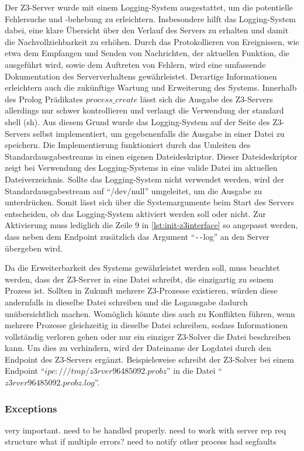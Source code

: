 Der Z3-Server wurde mit einem Logging-System ausgestattet, um die potentielle Fehlersuche und -behebung zu erleichtern.
Insbesondere hilft das Logging-System dabei, eine klare Übersicht über den Verlauf des Servers zu erhalten und damit die Nachvollziehbarkeit zu erhöhen.
Durch das Protokollieren von Ereignissen, wie etwa dem Empfangen und Senden von Nachrichten, der aktuellen Funktion, die ausgeführt wird, sowie dem Auftreten von Fehlern,
wird eine umfassende Dokumentation des Serververhaltens gewährleistet.
Derartige Informationen erleichtern auch die zukünftige Wartung und Erweiterung des Systems.
Innerhalb des Prolog Prädikates $process\_create$ lässt sich die Ausgabe des Z3-Servers allerdings nur schwer kontrollieren und verlangt die Verwendung der standard shell (sh).
Aus diesem Grund wurde das Logging-System auf der Seite des Z3-Servers selbst implementiert, um gegebenenfalls die Ausgabe in einer Datei zu speichern.
Die Implementierung funktioniert durch das Umleiten des Standardausgabestreams in einen eigenen Dateideskriptor.
Dieser Dateideskriptor zeigt bei Verwendung des Logging-Systems in eine valide Datei im aktuellen Dateiverzeichnis.
Sollte das Logging-System nicht verwendet werden, wird der Standardausgabestream auf \enquote{/dev/null} umgeleitet, um die Ausgabe zu unterdrücken.
Somit lässt sich über die Systemargumente beim Start des Servers entscheiden, ob das Logging-System aktiviert werden soll oder nicht.
Zur Aktivierung muss lediglich die Zeile 9 in \cref{lst:init-z3interface} so angepasst werden, dass neben dem Endpoint zusätzlich das Argument \enquote{\texttt{-}\texttt{-}log} an den Server übergeben wird.

Da die Erweiterbarkeit des Systems gewährleistet werden soll, muss beachtet werden, dass der Z3-Server in eine Datei schreibt, die einzigartig zu seinem Prozess ist.
Sollten in Zukunft mehrere Z3-Prozesse existieren, würden diese andernfalls in dieselbe Datei schreiben und die Logausgabe dadurch unübersichtlich machen.
Womöglich könnte dies auch zu Konflikten führen, wenn mehrere Prozesse gleichzeitig in dieselbe Datei schreiben, sodass Informationen vollständig verloren gehen oder nur ein einziger Z3-Solver die Datei beschreiben kann.
Um dies zu verhindern, wird der Dateiname der Logdatei durch den Endpoint des Z3-Servers ergänzt.
Beispielsweise schreibt der Z3-Solver bei einem Endpoint \enquote{$ipc:///tmp/z3rver96485092.probz$} in die Datei \enquote{$z3rver96485092.probz.log$}.






\subsubsection{Exceptions}
\label{sec:exceptions}

very important.
need to be handled properly.
need to work with server rep req structure
what if multiple errors?
need to notify other process
had segfaults


